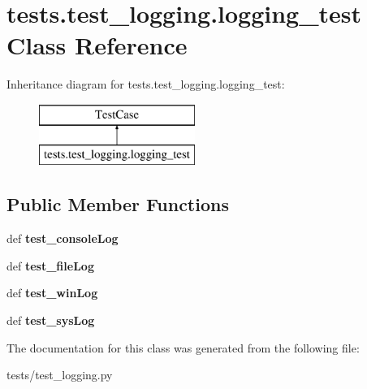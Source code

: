 \hypertarget{classtests_1_1test__logging_1_1logging__test}{\section{tests.\-test\-\_\-logging.\-logging\-\_\-test Class Reference}
\label{classtests_1_1test__logging_1_1logging__test}
}
Inheritance diagram for tests.\-test\-\_\-logging.\-logging\-\_\-test\-:\begin{figure}[H]
\begin{center}
\leavevmode
\includegraphics[height=2.000000cm]{classtests_1_1test__logging_1_1logging__test}
\end{center}
\end{figure}
\subsection*{Public Member Functions}
\begin{DoxyCompactItemize}
\item 
\hypertarget{classtests_1_1test__logging_1_1logging__test_a6a59a0bf71034e1bf1caaa344f699634}{def {\bfseries test\-\_\-console\-Log}}\label{classtests_1_1test__logging_1_1logging__test_a6a59a0bf71034e1bf1caaa344f699634}

\item 
\hypertarget{classtests_1_1test__logging_1_1logging__test_a154d315e10e09429d4973f2c67b12032}{def {\bfseries test\-\_\-file\-Log}}\label{classtests_1_1test__logging_1_1logging__test_a154d315e10e09429d4973f2c67b12032}

\item 
\hypertarget{classtests_1_1test__logging_1_1logging__test_acc7ef4334b71e960133d7ce2658d7943}{def {\bfseries test\-\_\-win\-Log}}\label{classtests_1_1test__logging_1_1logging__test_acc7ef4334b71e960133d7ce2658d7943}

\item 
\hypertarget{classtests_1_1test__logging_1_1logging__test_aaa437e49fdd109eda78d2d3a6c39d512}{def {\bfseries test\-\_\-sys\-Log}}\label{classtests_1_1test__logging_1_1logging__test_aaa437e49fdd109eda78d2d3a6c39d512}

\end{DoxyCompactItemize}


The documentation for this class was generated from the following file\-:\begin{DoxyCompactItemize}
\item 
tests/test\-\_\-logging.\-py\end{DoxyCompactItemize}
